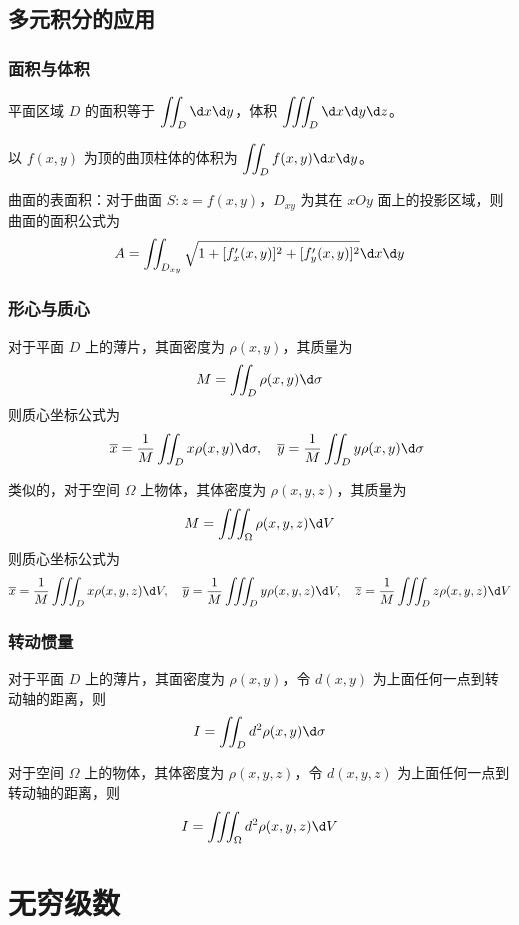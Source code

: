 \subsection{多元积分的应用}

\subsubsection*{面积与体积}

平面区域 $D$ 的面积等于 $\displaystyle \iint_D \d x \d y$，体积 $\displaystyle \iiint_D \d x \d y \d z$。

以 $f(x,y)$ 为顶的曲顶柱体的体积为 $\displaystyle \iint_D f(x, y)\d x \d y$。

曲面的表面积：对于曲面 $S: z = f(x,y)$，$D_{xy}$ 为其在 $xOy$ 面上的投影区域，则曲面的面积公式为
\[ A = \iint_{D_{xy}} \sqrt{ 1 + [f_x'(x,y)]^2 + [f_y'(x,y)]^2 } \d x \d y \]


\subsubsection*{形心与质心}

对于平面 $D$ 上的薄片，其面密度为 $\rho(x, y)$，其质量为
\[ M = \iint_D \rho(x,y) \d \sigma \]
则质心坐标公式为
\[ \quad \overline{x} = \frac{1}{M}\iint_D x \rho(x,y) \d \sigma, \quad \overline{y} =\frac{1}{M}\iint_D y \rho(x,y) \d \sigma \]

类似的，对于空间 $\Omega$ 上物体，其体密度为 $\rho(x, y, z)$，其质量为
\[ M = \iiint_\Omega \rho(x,y,z) \d V \]
则质心坐标公式为
\[ \overline{x} = \frac{1}{M}\iiint_D x \rho(x,y,z) \d V, \quad \overline{y} = \frac{1}{M}\iiint_D y \rho(x,y,z) \d V, \quad \overline{z} = \frac{1}{M}\iiint_D z \rho(x,y,z) \d V \]

\subsubsection*{转动惯量}

对于平面 $D$ 上的薄片，其面密度为 $\rho(x, y)$，令 $d(x,y)$ 为上面任何一点到转动轴的距离，则
\[ I = \iint_D d^2 \rho(x, y) \d \sigma \]

对于空间 $\Omega$ 上的物体，其体密度为 $\rho(x, y, z)$，令 $d(x,y,z)$ 为上面任何一点到转动轴的距离，则
\[ I = \iiint_\Omega d^2 \rho(x, y, z) \d V \]

\section{无穷级数}

